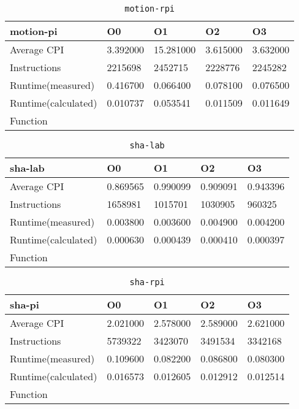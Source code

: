 \begin{table}[ht!]
\centering
\caption{\texttt{motion-rpi}}
\label{tab:motion-rpi}
\begin{tabular}{|l|l|l|l|l|}
\hline
\textbf{motion-pi}	&	\textbf{O0}	&	\textbf{O1}	&	\textbf{O2}	&	\textbf{O3}	\\\hline\hline
Average CPI	&	3.392000	&	15.281000	&	3.615000	&	3.632000	\\\hline
Instructions	&	2215698	&	2452715	&	2228776	&	2245282	\\\hline
Runtime(measured)	&	0.416700	&	0.066400	&	0.078100	&	0.076500	\\\hline
Runtime(calculated)	&	0.010737	&	0.053541	&	0.011509	&	0.011649	\\\hline
Function	&		&		&		&		\\\hline
\end{tabular}
\end{table}
\begin{table}[ht!]
\centering
\caption{\texttt{sha-lab}}
\label{tab:sha-lab}
\begin{tabular}{|l|l|l|l|l|}
\hline
\textbf{sha-lab}	&	\textbf{O0}	&	\textbf{O1}	&	\textbf{O2}	&	\textbf{O3}	\\\hline\hline
Average CPI	&	0.869565	&	0.990099	&	0.909091	&	0.943396	\\\hline
Instructions	&	1658981	&	1015701	&	1030905	&	960325	\\\hline
Runtime(measured)	&	0.003800	&	0.003600	&	0.004900	&	0.004200	\\\hline
Runtime(calculated)	&	0.000630	&	0.000439	&	0.000410	&	0.000397	\\\hline
Function	&		&		&		&		\\\hline
\end{tabular}
\end{table}
\begin{table}[ht!]
\centering
\caption{\texttt{sha-rpi}}
\label{tab:sha-rpi}
\begin{tabular}{|l|l|l|l|l|}
\hline
\textbf{sha-pi}	&	\textbf{O0}	&	\textbf{O1}	&	\textbf{O2}	&	\textbf{O3}	\\\hline\hline
Average CPI	&	2.021000	&	2.578000	&	2.589000	&	2.621000	\\\hline
Instructions	&	5739322	&	3423070	&	3491534	&	3342168	\\\hline
Runtime(measured)	&	0.109600	&	0.082200	&	0.086800	&	0.080300	\\\hline
Runtime(calculated)	&	0.016573	&	0.012605	&	0.012912	&	0.012514	\\\hline
Function	&		&		&		&		\\\hline
\end{tabular}
\end{table}
